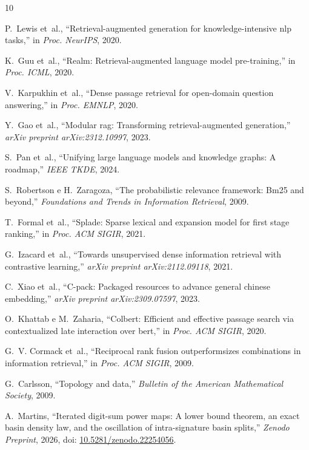 \documentclass[10pt,twocolumn]{article}
\theoremstyle{definition}
\begin{document}
\balance

\begin{thebibliography}{10}

P.~Lewis et~al., ``Retrieval-augmented generation for knowledge-intensive nlp tasks,'' in \emph{Proc. NeurIPS}, 2020.

K.~Guu et~al., ``Realm: Retrieval-augmented language model pre-training,'' in \emph{Proc. ICML}, 2020.

V.~Karpukhin et~al., ``Dense passage retrieval for open-domain question answering,'' in \emph{Proc. EMNLP}, 2020.

Y.~Gao et~al., ``Modular rag: Transforming retrieval-augmented generation,'' \emph{arXiv preprint arXiv:2312.10997}, 2023.

S.~Pan et~al., ``Unifying large language models and knowledge graphs: A roadmap,'' \emph{IEEE TKDE}, 2024.

S.~Robertson e H.~Zaragoza, ``The probabilistic relevance framework: Bm25 and beyond,'' \emph{Foundations and Trends in Information Retrieval}, 2009.

T.~Formal et~al., ``Splade: Sparse lexical and expansion model for first stage ranking,'' in \emph{Proc. ACM SIGIR}, 2021.

G.~Izacard et~al., ``Towards unsupervised dense information retrieval with contrastive learning,'' \emph{arXiv preprint arXiv:2112.09118}, 2021.

C.~Xiao et~al., ``C-pack: Packaged resources to advance general chinese embedding,'' \emph{arXiv preprint arXiv:2309.07597}, 2023.

O.~Khattab e M.~Zaharia, ``Colbert: Efficient and effective passage search via contextualized late interaction over bert,'' in \emph{Proc. ACM SIGIR}, 2020.

G.~V. Cormack et~al., ``Reciprocal rank fusion outperformsizes combinations in information retrieval,'' in \emph{Proc. ACM SIGIR}, 2009.

G.~Carlsson, ``Topology and data,'' \emph{Bulletin of the American Mathematical Society}, 2009.

A.~Martins, ``Iterated digit-sum power maps: A lower bound theorem, an exact basin density law, and the oscillation of intra-signature basin splits,'' \emph{Zenodo Preprint}, 2026, doi: \href{https://doi.org/10.5281/zenodo.22254056}{10.5281/zenodo.22254056}.

\end{thebibliography}
\end{document}
